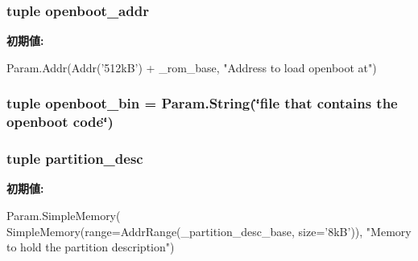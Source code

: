 \label{classSparcSystem_1_1SparcSystem_a55a83092d14516c005d89ee782768dbb}
\hypertarget{classSparcSystem_1_1SparcSystem_af9c20be318035d57c166c80966c9e8ef}{
\subsubsection[{openboot\_\-addr}]{\setlength{\rightskip}{0pt plus 5cm}tuple openboot\_\-addr}}
\label{classSparcSystem_1_1SparcSystem_af9c20be318035d57c166c80966c9e8ef}
{\bfseries 初期値:}
\begin{DoxyCode}
Param.Addr(Addr('512kB') + _rom_base,
                               "Address to load openboot at")
\end{DoxyCode}
\hypertarget{classSparcSystem_1_1SparcSystem_a63c9491b9f9c4adbe9e595e2cc479c4f}{
\subsubsection[{openboot\_\-bin}]{\setlength{\rightskip}{0pt plus 5cm}tuple openboot\_\-bin = Param.String(\char`\"{}file that contains the {\bf openboot} code\char`\"{})}}
\label{classSparcSystem_1_1SparcSystem_a63c9491b9f9c4adbe9e595e2cc479c4f}
\hypertarget{classSparcSystem_1_1SparcSystem_ac24f22805b57eeafeae771d3279fbda0}{
\subsubsection[{partition\_\-desc}]{\setlength{\rightskip}{0pt plus 5cm}tuple {\bf partition\_\-desc}}}
\label{classSparcSystem_1_1SparcSystem_ac24f22805b57eeafeae771d3279fbda0}
{\bfseries 初期値:}
\begin{DoxyCode}
Param.SimpleMemory(
        SimpleMemory(range=AddrRange(_partition_desc_base, size='8kB')),
        "Memory to hold the partition description")
\end{DoxyCode}
